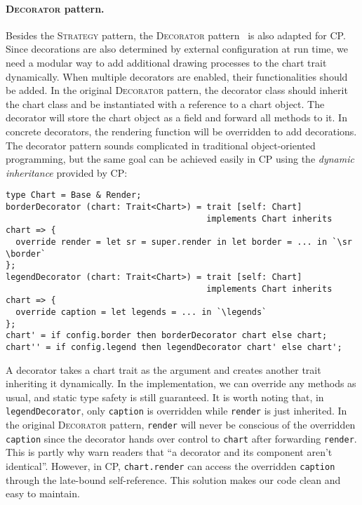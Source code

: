 \paragraph{\textsc{Decorator} pattern.}
Besides the \textsc{Strategy} pattern, the \textsc{Decorator}
pattern~\citep{gamma1995design} is also adapted for CP. Since decorations are
also determined by external configuration at run time, we need a modular way to
add additional drawing processes to the chart trait dynamically. When multiple
decorators are enabled, their functionalities should be added. In the original
\textsc{Decorator} pattern, the decorator class should inherit the chart class
and be instantiated with a reference to a chart object. The decorator will store
the chart object as a field and forward all methods to it. In concrete
decorators, the rendering function will be overridden to add decorations. The
decorator pattern sounds complicated in traditional object-oriented programming,
but the same goal can be achieved easily in CP using the \emph{dynamic
inheritance} provided by CP:

\begin{lstlisting}
type Chart = Base & Render;
borderDecorator (chart: Trait<Chart>) = trait [self: Chart]
                                        implements Chart inherits chart => {
  override render = let sr = super.render in let border = ... in `\sr \border`
};
legendDecorator (chart: Trait<Chart>) = trait [self: Chart]
                                        implements Chart inherits chart => {
  override caption = let legends = ... in `\legends`
};
chart' = if config.border then borderDecorator chart else chart;
chart'' = if config.legend then legendDecorator chart' else chart';
\end{lstlisting}

\noindent
A decorator takes a chart trait as the argument and creates another trait
inheriting it dynamically. In the implementation, we can override any methods as
usual, and static type safety is still guaranteed. It is worth noting that, in
\lstinline{legendDecorator}, only \lstinline{caption} is overridden while
\lstinline{render} is just inherited. In the original \textsc{Decorator}
pattern, \lstinline{render} will never be conscious of the overridden
\lstinline{caption} since the decorator hands over control to \lstinline{chart}
after forwarding \lstinline{render}. This is partly why \citet{gamma1995design}
warn readers that ``a decorator and its component aren't identical''. However,
in CP, \lstinline{chart.render} can access the overridden \lstinline{caption}
through the late-bound self-reference. This solution makes our code clean and
easy to maintain.

